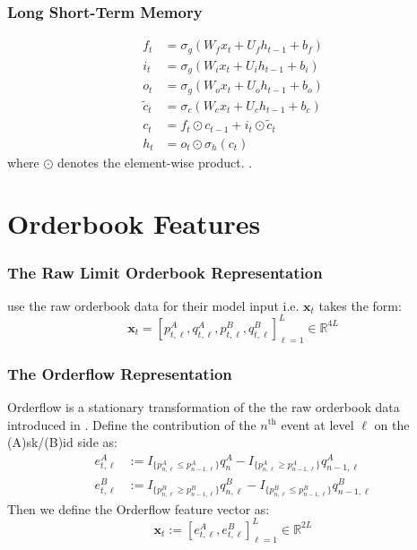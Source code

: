 \documentclass[handout]{beamer}
\begin{document}
\begin{frame}
    \frametitle{Long Short-Term Memory}
    \begin{equation}
        \begin{aligned}
            f_t &= \sigma_g(W_f x_t + U_f h_{t-1} + b_f) \\
            i_t &= \sigma_g(W_i x_t + U_i h_{t-1} + b_i) \\
            o_t &= \sigma_g(W_o x_t + U_o h_{t-1} + b_o) \\
            \tilde{c}_t &= \sigma_c(W_c x_t + U_c h_{t-1} + b_c) \\
                    c_t &= f_t \odot c_{t-1} + i_t \odot \tilde{c}_t \\
            h_t &= o_t \odot \sigma_h(c_t)
        \end{aligned}
    \end{equation}
    where $\odot$ denotes the element-wise product. {\color{blue}\cite{HOCHREITER1997}}.
\end{frame}

\section{Orderbook Features}
\begin{frame}
    \frametitle{The Raw Limit Orderbook Representation}
    {\color{blue}\cite{ZHANG2019}} use the raw orderbook data for their model input i.e. $\bm{x}_t$ takes the form:
    \begin{equation}
        \bm{x}_t = [p_{t, \ell}^A, q_{t, \ell}^A, p_{t, \ell}^B, q_{t, \ell}^B]_{\ell=1}^{L} \in \mathbb{R}^{4L}
    \end{equation}
\end{frame}

\begin{frame}
    \frametitle{The Orderflow Representation}
    Orderflow is a stationary transformation of the the raw orderbook data introduced in {\color{blue}\cite{CONT2013}}.
    Define the contribution of the $n^\text{th}$ event at level $\ell$ on the (A)sk/(B)id side as: 
    \begin{align}
        e_{t,\ell}^{A} &:=  I_{\{ p_{n, \ell}^A \leq p_{n-1,\ell}^A \}} q_{n}^A - I_{\{ p_{n, \ell}^A \geq p_{n-1, \ell}^A \}} q_{n-1, \ell}^A \\
        e_{t, \ell}^{B} &:= I_{\{ p_{n, \ell}^B \geq p_{n-1, \ell}^B \}} q_{n, \ell}^B - I_{\{ p_{n, \ell}^B \leq p_{n-1, \ell}^B \}} q_{n-1, \ell}^B
    \end{align}
    Then we define the Orderflow feature vector as:
    \begin{equation}
        \bm{x}_t := [e_{t, \ell}^{A}, e_{t, \ell}^{B}]_{\ell=1}^L \in \mathbb{R}^{2L} \label{OF_feature_vector}
    \end{equation}
\end{frame}
\end{document}
